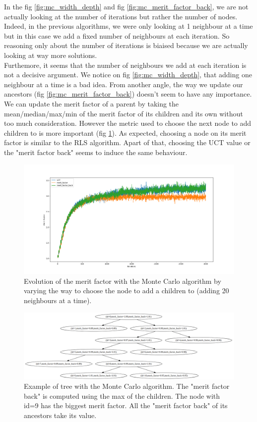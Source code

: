 \documentclass[a4paper,11pt,openany]{article}
\begin{document}
\noindent
In the fig \ref{fig:mc_width_depth} and fig \ref{fig:mc_merit_factor_back}, we are not actually looking at the number of iterations but rather the number of nodes. Indeed, in the previous algorithms, we were only looking at 1 neighbour at a time but in this case we add a fixed number of neighbours at each iteration. So reasoning only about the number of iterations is biaised because we are actually looking at way more solutions.\\
Furthemore, it seems that the number of neighbours we add at each iteration is not a decisive argument. We notice on fig \ref{fig:mc_width_depth}, that adding one neighbour at a time is a bad idea. From another angle, the way we update our ancestors (fig \ref{fig:mc_merit_factor_back}) doesn't seem to have any importance. We can update the merit factor of a parent by taking the mean/median/max/min of the merit factor of its children and its own without too much consideration. However the metric used to choose the next node to add children to is more important (fig \ref{fig:mc_choose_children}). As expected, choosing a node on its merit factor is similar to the RLS algorithm. Apart of that, choosing the UCT value or the "merit factor back" seems to induce the same behaviour.
\begin{figure}[H]
\begin{center}
\includegraphics[scale=0.22]{Images/mc_choose_children}
\caption{Evolution of the merit factor with the Monte Carlo algorithm by varying the way to choose the node to add a children to (adding 20 neighbours at a time).}
\label{fig:mc_choose_children}
\end{center}
\end{figure}
\begin{figure}[H]
\begin{center}
\includegraphics[scale=0.3]{Images/mc_tree}
\caption{Example of tree with the Monte Carlo algorithm. The "merit factor back" is computed using the max of the children. The node with id=9 has the biggest merit factor. All the "merit factor back" of its ancestors take its value.}
\label{fig:mc_tree}
\end{center}
\end{figure}
\end{document}
